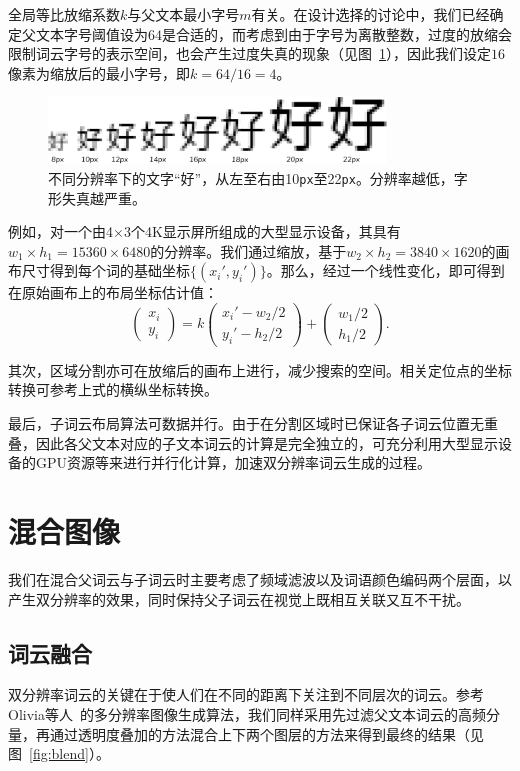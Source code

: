 全局等比放缩系数$k$与父文本最小字号$m$有关。在设计选择的讨论中，我们已经确定父文本字号阈值设为$64$是合适的，而考虑到由于字号为离散整数，过度的放缩会限制词云字号的表示空间，也会产生过度失真的现象（见图~\ref{fig:font_size}），因此我们设定$16$像素为缩放后的最小字号，即$k = 64/16=4$。
\begin{figure}[htbp]
	\centering
	\includegraphics[width=0.8\textwidth]{figures/font_size.png}
	\caption{不同分辨率下的文字``好''，从左至右由10\texttt{px}至22\texttt{px}。分辨率越低，字形失真越严重。}
	\label{fig:font_size}
\end{figure}

例如，对一个由4$\times$3个4K显示屏所组成的大型显示设备，其具有$w_1\times h_1 = 15360\times6480$的分辨率。我们通过缩放，基于$w_2\times h_2 = 3840\times 1620$的画布尺寸得到每个词的基础坐标$\{(x_i', y_i')\}$。那么，经过一个线性变化，即可得到在原始画布上的布局坐标估计值：
\begin{equation*}
\begin{pmatrix}
x_i\\
y_i
\end{pmatrix}
 =  k\begin{pmatrix}
 x_i'-w_2/2\\
 y_i'-h_2/2
 \end{pmatrix}
 +\begin{pmatrix}
w_1/2\\
 h_1/2
 \end{pmatrix} .
\end{equation*}

其次，区域分割亦可在放缩后的画布上进行，减少搜索的空间。相关定位点的坐标转换可参考上式的横纵坐标转换。

最后，子词云布局算法可数据并行。由于在分割区域时已保证各子词云位置无重叠，因此各父文本对应的子文本词云的计算是完全独立的，可充分利用大型显示设备的GPU资源等来进行并行化计算，加速双分辨率词云生成的过程。

\section{混合图像}
我们在混合父词云与子词云时主要考虑了频域滤波以及词语颜色编码两个层面，以产生双分辨率的效果，同时保持父子词云在视觉上既相互关联又互不干扰。
\subsection{词云融合}
双分辨率词云的关键在于使人们在不同的距离下关注到不同层次的词云。参考Olivia等人~\supercite{Olivia2006}的多分辨率图像生成算法，我们同样采用先过滤父文本词云的高频分量，再通过透明度叠加的方法混合上下两个图层的方法来得到最终的结果（见图~\ref{fig:blend}）。

